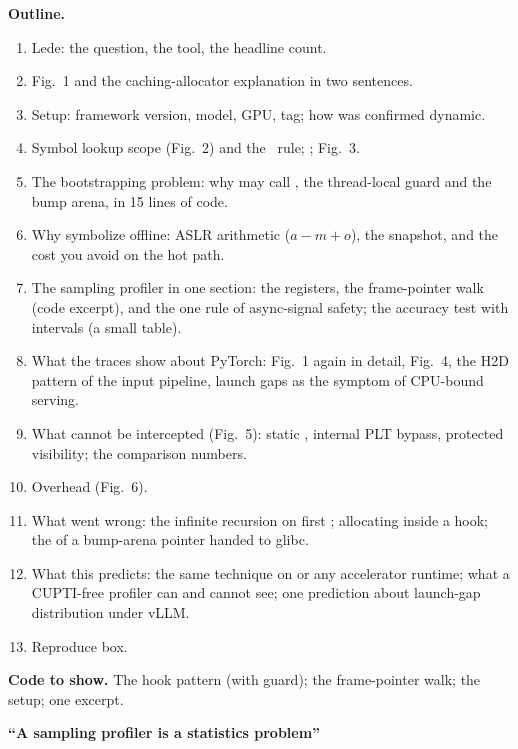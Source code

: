 \begin{blogbox}
\textbf{Outline.}
\begin{enumerate}
  \item Lede: the question, the tool, the headline count.
  \item Fig.~1 and the caching-allocator explanation in two sentences.
  \item Setup: framework version, model, GPU, tag; how  was confirmed dynamic.
  \item Symbol lookup scope (Fig.~2) and the \csapp\ rule; ; Fig.~3.
  \item The bootstrapping problem: why  may call , the thread-local guard and the bump arena, in 15 lines of code.
  \item Why symbolize offline: ASLR arithmetic ($a - m + o$), the  snapshot, and the cost you avoid on the hot path.
  \item The sampling profiler in one section: the  registers, the frame-pointer walk (code excerpt), and the one rule of async-signal safety; the accuracy test with intervals (a small table).
  \item What the traces show about PyTorch: Fig.~1 again in detail, Fig.~4, the H2D pattern of the input pipeline, launch gaps as the symptom of CPU-bound serving.
  \item What cannot be intercepted (Fig.~5): static , internal PLT bypass, protected visibility; the  comparison numbers.
  \item Overhead (Fig.~6).
  \item What went wrong: the infinite recursion on first ;  allocating inside a hook; the  of a bump-arena pointer handed to glibc.
  \item What this predicts: the same technique on  or any accelerator runtime; what a CUPTI-free profiler can and cannot see; one prediction about launch-gap distribution under vLLM.
  \item Reproduce box.
\end{enumerate}

\textbf{Code to show.} The hook pattern (with guard); the frame-pointer walk; the  setup; one  excerpt.

 \textbf{``A sampling profiler is a statistics problem''}


\end{blogbox}
